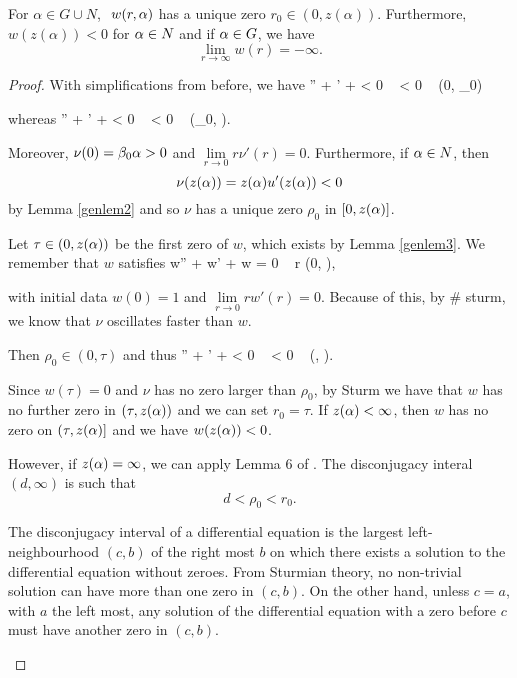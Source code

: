 \begin{lemma}\label{genlem6}
For $\alpha\in G\cup N$, $~w(r,\alpha)$ has a unique zero $r_0\in(0,z(\alpha)).$
Furthermore, \hfill\\ $w(z(\alpha))<0$ for $\alpha\in N$ and if $\alpha\in G$, we have
\[
\underset{r\to\infty}{\lim}w(r)=-\infty.
\]
\end{lemma}
\begin{proof}
With simplifications from before, we have
\be \label{nulivp}
\nu'' +  \nu' +  \nu < 0
\quad {} ~ \nu < 0 \quad {} ~ (0, \rho_0)
\ee

whereas
\be \label{nugivp}
\nu'' +  \nu' +  \nu < 0
\quad {} ~ \nu < 0 \quad {} ~ (\rho_0, \za).
\ee

Moreover, $\nu(0) = \beta_0 \alpha > 0$ and $\underset{r\to 0}{\lim} r\nu'(r) = 0$.
Furthermore, if $\alpha\in N$, then 
\[ \nu(z(\alpha)) = z(\alpha) u'(z(\alpha)) < 0 \]
by Lemma \ref{genlem2} and so $\nu$ has a unique zero $\rho_0$ in $[0,z(\alpha)]$.

Let $\tau \in (0,z(\alpha))$ be the first zero of $w$, which exists by Lemma
\ref{genlem3}. We remember that $w$ satisfies
\be \label{wivp}
w'' +  w' +  w = 0
\quad {} ~ r \in (0, \za),
\ee

with initial data $w(0) = 1$ and $\underset{r\to 0}{\lim} rw'(r) = 0$. Because
of this, by \# sturm, we know that $\nu$ oscillates faster than $w$.

Then $\rho_0 \in (0,\tau)$ and thus
\be \label{nutivp}
\nu'' +  \nu' +  \nu < 0
\quad {} ~ \nu < 0 \quad {} ~ (\tau, \za).
\ee

Since $w(\tau)=0$ and $\nu$ has no zero larger than $\rho_0$, by Sturm we have
that $w$ has no further zero in $(\tau, z(\alpha))$ and we can set $r_0 = \tau$. If
$z(\alpha) < \infty$, then $w$ has no zero on $(\tau, z(\alpha)]$ and we have $w(z(\alpha)) < 0$.

However, if $z(\alpha) = \infty$, we can apply Lemma 6 of \cite[p.~249]{kwong}. The
disconjugacy interal $(d, \infty)$ is such that 
\[ d < \rho_0 < r_0. \]

\begin{emph}
    The disconjugacy interval of a differential equation is the largest
    left-neighbourhood $(c, b)$ of the {\red right most} $b$ on which there
    exists a solution to the differential equation without zeroes. From Sturmian
    theory, no non-trivial solution can have more than one zero in $(c, b)$. On
    the other hand, unless $c = a$, with $a$ the {\red left most}, any solution
    of the differential equation with a zero before $c$ must have another zero
    in $(c, b)$. 


\end{emph}
\end{proof}
